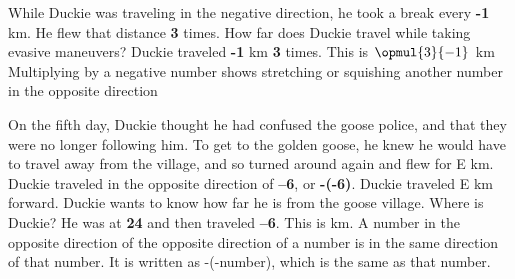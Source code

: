 \documentclass[a4paper,11pt ]{book}
\begin{document}
{While Duckie was traveling in the negative direction, he took a break every \textbf{-1} km. He flew that distance  \textbf{3} times. How far does Duckie travel while taking evasive maneuvers?}
{Duckie traveled \textbf{-1} km \textbf{3} times. This is $\opmul{3}{-1}$ km}
{Multiplying by a negative number shows stretching or squishing another number in the opposite direction}
{}
{On the fifth day, Duckie thought he had confused the goose police, and that they were no longer following him. To get to the golden goose, he knew he would have to travel away from the village, and so turned around again and flew for E km. Duckie traveled in the opposite direction of \textbf{–6}, or \textbf{-(-6)}. Duckie traveled E km forward. Duckie wants to know how far he is from the goose village. Where is Duckie?}
{He was at \textbf{24} and then traveled \textbf{--6}. This is  km.}
{A number in the opposite direction of the opposite direction of a number is in the same direction of that number. It is written as -(-number), which is the same as  that number.}
\end{document}
